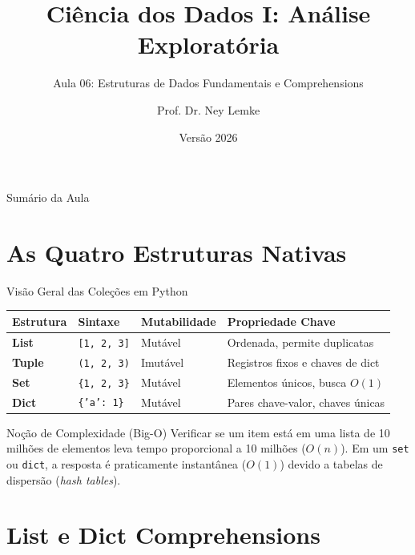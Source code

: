 \documentclass[aspectratio=169, 10pt]{beamer}
\title[Aula 06 - Estruturas de Dados]{Ciência dos Dados I: Análise Exploratória}
\subtitle{Aula 06: Estruturas de Dados Fundamentais e Comprehensions}
\author{Prof. Dr. Ney Lemke}
\institute{UNESP -- Instituto de Biociências de Botucatu}
\date{Versão 2026}
\begin{document}
\frame{\titlepage}

\begin{frame}{Sumário da Aula}
  \tableofcontents
\end{frame}

\section{As Quatro Estruturas Nativas}

\begin{frame}{Visão Geral das Coleções em Python}
  \begin{table}[]
    \centering
    \begin{tabular}{@{}llll@{}}
      \toprule
      \textbf{Estrutura} & \textbf{Sintaxe} & \textbf{Mutabilidade} & \textbf{Propriedade Chave} \\ \midrule
      \textbf{List} & \texttt{[1, 2, 3]} & Mutável & Ordenada, permite duplicatas \\
      \textbf{Tuple} & \texttt{(1, 2, 3)} & Imutável & Registros fixos e chaves de dict \\
      \textbf{Set} & \texttt{\{1, 2, 3\}} & Mutável & Elementos únicos, busca $O(1)$ \\
      \textbf{Dict} & \texttt{\{'a': 1\}} & Mutável & Pares chave-valor, chaves únicas \\ \bottomrule
    \end{tabular}
  \end{table}
  \begin{block}{Noção de Complexidade (Big-O)}
    Verificar se um item está em uma lista de 10 milhões de elementos leva tempo proporcional a 10 milhões ($O(n)$). Em um \texttt{set} ou \texttt{dict}, a resposta é praticamente instantânea ($O(1)$) devido a tabelas de dispersão (\textit{hash tables}).
  \end{block}
\end{frame}

\section{List e Dict Comprehensions}
\end{document}
